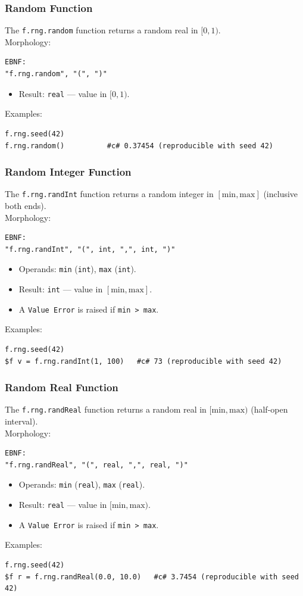 \subsubsection{Random Function}
The \texttt{f.rng.random} function returns a random real in $[0, 1)$. \\
Morphology:
\begin{verbatim}
EBNF:
"f.rng.random", "(", ")"
\end{verbatim}
\begin{itemize}
\item Result: \texttt{real} --- value in $[0, 1)$.
\end{itemize}
Examples:
\begin{verbatim}
f.rng.seed(42)
f.rng.random()          #c# 0.37454 (reproducible with seed 42)
\end{verbatim}

\subsubsection{Random Integer Function}
The \texttt{f.rng.randInt} function returns a random integer in $[\text{min}, \text{max}]$ (inclusive both ends). \\
Morphology:
\begin{verbatim}
EBNF:
"f.rng.randInt", "(", int, ",", int, ")"
\end{verbatim}
\begin{itemize}
\item Operands: \texttt{min} (\texttt{int}), \texttt{max} (\texttt{int}).
\item Result: \texttt{int} --- value in $[\text{min}, \text{max}]$.
\item A \texttt{Value Error} is raised if \texttt{min > max}.
\end{itemize}
Examples:
\begin{verbatim}
f.rng.seed(42)
$f v = f.rng.randInt(1, 100)   #c# 73 (reproducible with seed 42)
\end{verbatim}

\subsubsection{Random Real Function}
The \texttt{f.rng.randReal} function returns a random real in $[\text{min}, \text{max})$ (half-open interval). \\
Morphology:
\begin{verbatim}
EBNF:
"f.rng.randReal", "(", real, ",", real, ")"
\end{verbatim}
\begin{itemize}
\item Operands: \texttt{min} (\texttt{real}), \texttt{max} (\texttt{real}).
\item Result: \texttt{real} --- value in $[\text{min}, \text{max})$.
\item A \texttt{Value Error} is raised if \texttt{min > max}.
\end{itemize}
Examples:
\begin{verbatim}
f.rng.seed(42)
$f r = f.rng.randReal(0.0, 10.0)   #c# 3.7454 (reproducible with seed 42)
\end{verbatim}

